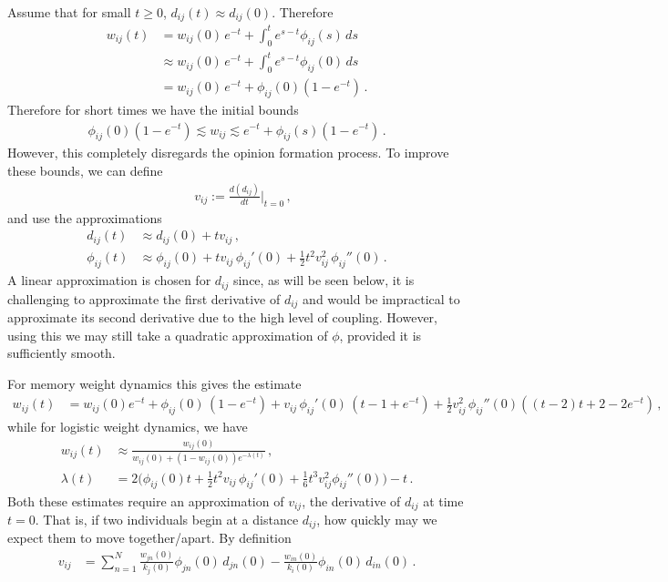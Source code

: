 \documentclass{article}
\begin{document}
Assume that for small $t\geq0$, $d_{ij}(t)\approx d_{ij}(0)$. Therefore 
\begin{align*}
    w_{ij}(t) 
    &= w_{ij}(0) \, e^{-t} + \int_0^t e^{s-t} \phi_{ij}(s)\,ds \\
    &\approx w_{ij}(0) \, e^{-t} + \int_0^t e^{s-t} \phi_{ij}(0)\,ds \\
    &= w_{ij}(0) \, e^{-t} + \phi_{ij}(0) (1 - e^{-t}) \,.
\end{align*}
Therefore for short times we have the initial bounds 
\begin{align*}
    \phi_{ij}(0) (1 - e^{-t}) \lesssim w_{ij} \lesssim e^{-t} + \phi_{ij}(s) (1 - e^{-t}) \,.
\end{align*}
However, this completely disregards the opinion formation process. To improve these bounds, we can define 
\begin{align*}
    \quad v_{ij} := \frac{d(d_{ij})}{dt} \bigg|_{t=0} \,,
\end{align*}
and use the approximations
\begin{subequations} \label{eqn: d and phi approximations}
    \begin{align}
        d_{ij}(t) &\approx d_{ij}(0) + t v_{ij} \,,\\
        \phi_{ij}(t) &\approx \phi_{ij}(0) + tv_{ij}\,\phi_{ij}'(0) + \frac{1}{2}t^2v_{ij}^2 \,\phi_{ij}''(0) \,. \label{eqn: phi approximation}
    \end{align}
\end{subequations}
A linear approximation is chosen for $d_{ij}$ since, as will be seen below, it is challenging to approximate the first derivative of $d_{ij}$ and would be impractical to approximate its second derivative due to the high level of coupling. However, using this we may still take a quadratic approximation of $\phi$, provided it is sufficiently smooth. 

For memory weight dynamics this gives the estimate 
\begin{align} \label{eqn: memory estimate}
    w_{ij}(t) 
    &= w_{ij}(0)e^{-t} + \phi_{ij}(0)\,(1-e^{-t}) + v_{ij}\,\phi_{ij}'(0)\,(t - 1 + e^{-t}) + \frac{1}{2}v_{ij}^2\,\phi_{ij}''(0) ((t-2)t + 2 - 2e^{-t}) \,,
\end{align}
while for logistic weight dynamics, we have 
\begin{align}
    w_{ij}(t) &\approx \frac{w_{ij}(0)}{w_{ij}(0) + (1-w_{ij}(0))e^{-\lambda(t)}} \,, \label{eqn:logistic estimate}\\[0.5em]
    \lambda(t) &= 2\Big(\phi_{ij}(0) t + \frac{1}{2}t^2 v_{ij}\,\phi_{ij}'(0) + \frac{1}{6}t^3 v_{ij}^2 \phi_{ij}''(0) \Big) - t \,. \nonumber
\end{align}
Both these estimates require an approximation of $v_{ij}$, the derivative of $d_{ij}$ at time $t=0$. That is, if two individuals begin at a distance $d_{ij}$, how quickly may we expect them to move together/apart. By definition
\begin{align*}
    v_{ij} 
    &= \sum_{n=1}^N \frac{w_{jn}(0)}{k_j(0)} \phi_{jn}(0) \, d_{jn}(0) - \frac{w_{in}(0)}{k_i(0)} \phi_{in}(0) \, d_{in}(0) \,.
\end{align*}
\end{document}
